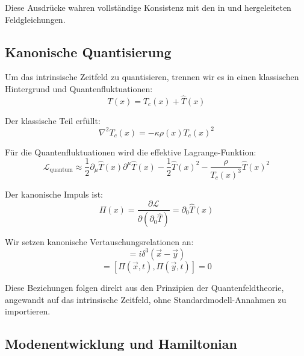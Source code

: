 \documentclass[12pt,a4paper]{article}
\begin{document}
	Diese Ausdrücke wahren vollständige Konsistenz mit den in \cite{Pascher2025Lagrange} und \cite{Pascher2025Higgs} hergeleiteten Feldgleichungen.
	
	\subsection{Kanonische Quantisierung}
	\label{subsec:canonical_quantization}
	
	Um das intrinsische Zeitfeld zu quantisieren, trennen wir es in einen klassischen Hintergrund und Quantenfluktuationen:
	\begin{equation}
		T(x) = T_c(x) + \hat{T}(x)
		\label{eq:quantum_decomposition}
	\end{equation}
	
	Der klassische Teil erfüllt:
	\begin{equation}
		\nabla^2 T_c(x) = -\kappa\rho(x)T_c(x)^2
		\label{eq:classical_field_equation}
	\end{equation}
	
	Für die Quantenfluktuationen wird die effektive Lagrange-Funktion:
	\begin{equation}
		\mathcal{L}_{\text{quantum}} \approx \frac{1}{2}\partial_{\mu}\hat{T}(x)\partial^{\mu}\hat{T}(x) - \frac{1}{2}\hat{T}(x)^2 - \frac{\rho}{T_c(x)^3}\hat{T}(x)^2
		\label{eq:quantum_lagrangian}
	\end{equation}
	
	Der kanonische Impuls ist:
	\begin{equation}
		\Pi(x) = \frac{\partial\mathcal{L}}{\partial(\partial_0 \hat{T})} = \partial_0 \hat{T}(x)
		\label{eq:canonical_momentum}
	\end{equation}
	
	Wir setzen kanonische Vertauschungsrelationen an:
	\begin{equation}
		[\hat{T}(\vec{x}, t), \Pi(\vec{y}, t)] = i\delta^3(\vec{x} - \vec{y})
		\label{eq:commutation_relation}
	\end{equation}
	\begin{equation}
		[\hat{T}(\vec{x}, t), \hat{T}(\vec{y}, t)] = [\Pi(\vec{x}, t), \Pi(\vec{y}, t)] = 0
		\label{eq:field_commutators}
	\end{equation}
	
	Diese Beziehungen folgen direkt aus den Prinzipien der Quantenfeldtheorie, angewandt auf das intrinsische Zeitfeld, ohne Standardmodell-Annahmen zu importieren.
	
	\subsection{Modenentwicklung und Hamiltonian}
	\label{subsec:mode_expansion}
	
\end{document}

